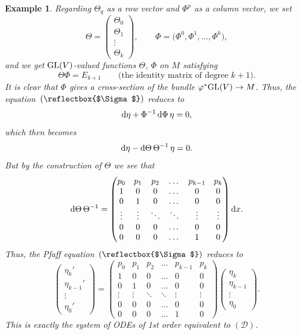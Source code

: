 \documentclass[10pt,a4paper]{amsart}
\newcommand{\cD}{\mathcal D}
\DeclareRobustCommand{\amgiS}{\text{\reflectbox{$\Sigma$}}}
\newtheorem{ex}[thm]{Example}
\numberwithin{equation}{section}
\begin{document}
\begin{ex}
Regarding $\Theta_q$ as a row vector and $\Phi^p$ as a column vector, we set
\[
\Theta = \begin{pmatrix} \Theta_0 \\ \Theta_1 \\ \vdots \\ \Theta_k \end{pmatrix}\!,\qquad
\Phi = \big(\Phi^0,\Phi^1,\dots,\Phi^k\big),
\]
and we get ${\rm GL}(V)$-valued functions $\Theta$, $\Phi$ on $M$ satisfying
\[
\Theta\Phi = E_{k+1} \qquad\text{(the identity matrix of degree $k+1$)}.
\]
It is clear that $\Phi$ gives a cross-section of the bundle $\varphi^*{\rm GL}(V)\to M$. Thus, the equation~$(\amgiS)$ reduces to
\[
{\rm d}\eta + \Phi^{-1}\,{\rm d}\Phi\,\eta = 0,
\]
which then becomes
\[
{\rm d}\eta - {\rm d}\Theta\,\Theta^{-1}\,\eta = 0.
\]
But by the construction of $\Theta$ we see that
\[
{\rm d}\Theta\,\Theta^{-1} =
\begin{pmatrix} p_0 & p_1 & p_2 & \dots & p_{k-1} & p_k \\
1 & 0 & 0 & \dots & 0 & 0\\
0 & 1 & 0 & \dots & 0 & 0\\
\vdots & \vdots & \ddots & \ddots & \vdots & \vdots \\
0 & 0 & 0 & \dots & 0 & 0 \\
0 & 0 & 0 & \dots & 1 & 0
\end{pmatrix}{\rm d}x.
\]
Thus, the Pfaff equation~$(\amgiS)$ reduces to
\[
\begin{pmatrix}
\eta_k' \\
\eta_{k-1}'\\
\vdots \\
\eta_0'
\end{pmatrix} =
\begin{pmatrix} p_0 & p_1 & p_2 & \dots & p_{k-1} & p_k \\
1 & 0 & 0 & \dots & 0 & 0\\
0 & 1 & 0 & \dots & 0 & 0\\
\vdots & \vdots & \ddots & \ddots & \vdots & \vdots \\
0 & 0 & 0 & \dots & 0 & 0 \\
0 & 0 & 0 & \dots & 1 & 0
\end{pmatrix}
\begin{pmatrix}
\eta_k \\
\eta_{k-1}\\
\vdots \\
\eta_0
\end{pmatrix}\!.
\]
This is exactly the system of ODEs of 1st order equivalent to $(\cD)$.


\end{ex}
\end{document}
